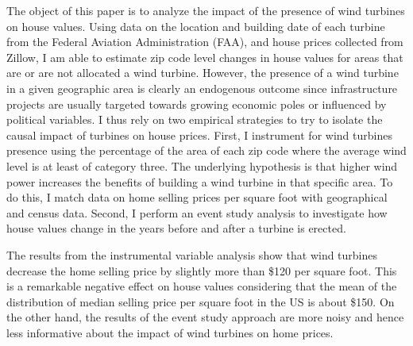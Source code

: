 \documentclass[twoside,12pt]{article}
\begin{document}
The object of this paper is to analyze the impact of the presence of wind turbines on house values. Using data on the location and building date of each turbine from the Federal Aviation Administration (FAA), and house prices collected from Zillow, I am able to estimate zip code level changes in house values for areas that are or are not allocated a wind turbine. However, the presence of a wind turbine in a given geographic area is clearly an endogenous outcome since infrastructure projects are usually targeted towards growing economic poles or influenced by political variables. I thus rely on two empirical strategies to try to isolate the causal impact of turbines on house prices. First, I instrument for wind turbines presence using the percentage of the area of each zip code where the average wind level is at least of category three. The underlying hypothesis is that higher wind power increases the benefits of building a wind turbine in that specific area. To do this, I match data on home selling prices per square foot with geographical and census data. Second, I perform an event study analysis to investigate how house values change in the years before and after a turbine is erected.

The results from the instrumental variable analysis show that wind turbines decrease the home selling price by slightly more than \$120 per square foot. This is a remarkable negative effect on house values considering that the mean of the distribution of median selling price per square foot in the US is about \$150. On the other hand, the results of the event study approach are more noisy and hence less informative about the impact of wind turbines on home prices. 
\end{document}
